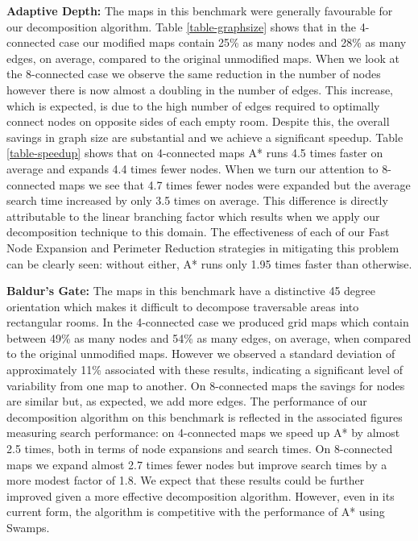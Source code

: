 \textbf{Adaptive Depth:}
The maps in this benchmark were generally favourable for our decomposition algorithm. 
Table \ref{table-graphsize} shows that in the 4-connected case our modified maps contain 
25\% as many nodes and 28\% as many edges, on average, compared to the original unmodified maps.
When we look at the 8-connected case we observe the same reduction in the number of nodes however there is now almost a
doubling in the number of edges.
This increase, which is expected, is due to the high number of edges required to optimally connect nodes on opposite sides of 
each empty room. 
Despite this, the overall savings in graph size are substantial and we achieve a significant speedup.
Table \ref{table-speedup} shows that on 4-connected maps A* runs 4.5 times faster on average and expands 4.4 times fewer nodes.
When we turn our attention to 8-connected maps we see that 4.7 times fewer nodes were expanded but the average
search time increased by only 3.5 times on average.
This difference is directly attributable to the linear branching factor which results when we apply our decomposition
technique to this domain. 
The effectiveness of each of our Fast Node Expansion and Perimeter Reduction strategies in mitigating this problem can
be clearly seen: without either, A* runs only 1.95 times faster than otherwise. 
\par
\textbf{Baldur's Gate:}
The maps in this benchmark have a distinctive 45 degree orientation which makes it difficult to decompose traversable
areas into rectangular rooms. 
In the 4-connected case we produced grid maps which contain between 49\% as many nodes and 54\% as many
edges, on average, when compared to the original unmodified maps.
However we observed a standard deviation of approximately 11\% associated with these results, indicating a significant level of
variability from one map to another.
On 8-connected maps the savings for nodes are similar but, as expected, we add more edges.
The performance of our decomposition algorithm on this benchmark is reflected in the associated figures measuring search performance:
on 4-connected maps we speed up A* by almost 2.5 times, both in terms of node expansions and search times.
On 8-connected maps we expand almost 2.7 times fewer nodes but improve search times by a more modest factor of 1.8.
We expect that these results could be further improved given a more effective decomposition algorithm.
However, even in its current form, the algorithm is competitive with the performance of A* using Swamps.


